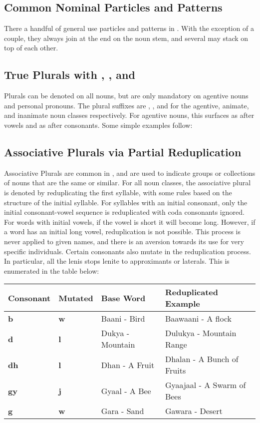 \subsection{Common Nominal Particles and Patterns}
There a handful of general use particles and patterns in \langname. With the exception of a couple, they always join at the end on the noun stem, and several may stack on top of each other.

  \subsection{True Plurals with \suffixtext{\agtconsplural}, \suffixtext{\animplural}, and \suffixtext{\inanplural}}
  Plurals can be denoted on all nouns, but are only mandatory on agentive nouns and personal pronouns. The plural suffixes are \suffixtext{\agtplural}, \suffixtext{\animplural}, and \suffixtext{\inanplural} for the agentive, animate, and inanimate noun classes respectively. For agentive nouns, this surfaces as \suffixtext{\agtvowelplural} after vowels and as \suffixtext{\agtconsplural} after consonants. Some simple examples follow:


  \subsection{Associative Plurals via Partial Reduplication}
  Associative Plurals are common in \langname, and are used to indicate groups or collections of nouns that are the same or similar. For all noun classes, the associative plural is denoted by reduplicating the first syllable, with some rules based on the structure of the initial syllable. For syllables with an initial consonant, only the initial consonant-vowel sequence is reduplicated with coda consonants ignored. For words with initial vowels, if the vowel is short it will become long. However, if a word has an initial long vowel, reduplication is not possible. This process is never applied to given names, and there is an aversion towards its use for very specific individuals.
  Certain consonants also mutate in the reduplication process. In particular, all the lenis stops lenite to approximants or laterals. This is enumerated in the table below:

  \vertspace
  \begin{tabular}{|l|l|l|l|}
    \hline
    Consonant   & Mutated    & Base Word        & Reduplicated Example         \\ \hline \hline
    \textbf{b}  & \textbf{w} & Baani - Bird     & Baawaani - A flock           \\
    \textbf{d}  & \textbf{l} & Dukya - Mountain & Dulukya  - Mountain Range    \\
    \textbf{dh} & \textbf{l} & Dhan  - A Fruit  & Dhalan   - A Bunch of Fruits \\
    \textbf{gy} & \textbf{j} & Gyaal - A Bee    & Gyaajaal - A Swarm of Bees   \\
    \textbf{g}  & \textbf{w} & Gara  - Sand     & Gawara   - Desert            \\ \hline
  \end{tabular}
  
